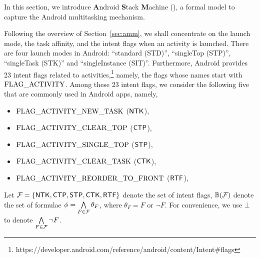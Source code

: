 
In this section, we introduce \textbf{A}ndroid \textbf{S}tack \textbf{M}achine (\AMASS), a formal model to capture the Android multitasking mechanism. 

Following the overview of Section~\ref{sec:amm}, we shall concentrate on the launch mode, the task affinity, and the intent flags when an activity is launched.  There are four launch modes in Android: ``standard (STD)'', ``singleTop (STP)'', ``singleTask (STK)'' and ``singleInstance (SIT)''.  
Furthermore, Android provides 23 intent flags related to activities,\footnote{https://developer.android.com/reference/android/content/Intent\#flags}
namely, the flags whose names start with $\rm FLAG\_ACTIVITY$. %
Among these 23 intent flags, we consider the following five that are commonly used in Android apps, namely,
\begin{itemize}
	\item $\rm FLAG\_ACTIVITY\_NEW\_TASK$ (${\sf NTK}$),
	\item $\rm FLAG\_ACTIVITY\_CLEAR\_TOP$ (${\sf CTP}$),
	\item $\rm  FLAG\_ACTIVITY\_SINGLE\_TOP$ (${\sf STP}$),
	\item $\rm  FLAG\_ACTIVITY\_CLEAR\_TASK$ (${\sf CTK}$),
	\item $\rm FLAG\_ACTIVITY\_REORDER\_TO\_FRONT$ (${\sf RTF}$),
\end{itemize}

Let $\mathcal{F}=\{{\sf NTK}, {\sf CTP}, {\sf STP}, {\sf CTK}, {\sf RTF} \}$ denote the set of intent flags, $\mathbb{B}(\mathcal{F})$ denote the set of formulae $\phi = \bigwedge \limits_{F \in \mathcal{F}} \theta_F$, where $\theta_F = F$ or $\neg F$. For convenience, we use $\bot$ to denote $ \bigwedge \limits_{F \in \mathcal{F}} \neg F$. 


